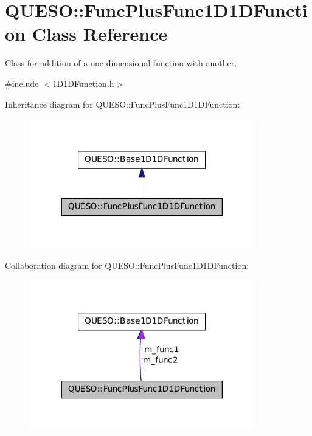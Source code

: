 \hypertarget{class_q_u_e_s_o_1_1_func_plus_func1_d1_d_function}{\section{Q\-U\-E\-S\-O\-:\-:Func\-Plus\-Func1\-D1\-D\-Function Class Reference}
\label{class_q_u_e_s_o_1_1_func_plus_func1_d1_d_function}
}


Class for addition of a one-\/dimensional function with another.  




{\ttfamily \#include $<$1\-D1\-D\-Function.\-h$>$}



Inheritance diagram for Q\-U\-E\-S\-O\-:\-:Func\-Plus\-Func1\-D1\-D\-Function\-:
\nopagebreak
\begin{figure}[H]
\begin{center}
\leavevmode
\includegraphics[width=278pt]{class_q_u_e_s_o_1_1_func_plus_func1_d1_d_function__inherit__graph}
\end{center}
\end{figure}


Collaboration diagram for Q\-U\-E\-S\-O\-:\-:Func\-Plus\-Func1\-D1\-D\-Function\-:
\nopagebreak
\begin{figure}[H]
\begin{center}
\leavevmode
\includegraphics[width=278pt]{class_q_u_e_s_o_1_1_func_plus_func1_d1_d_function__coll__graph}
\end{center}
\end{figure}
